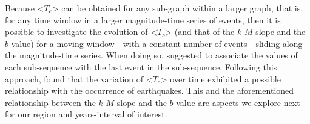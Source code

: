 Because <$T_c$> can be obtained for any sub-graph within a larger graph, that is, for any time window in a larger magnitude-time series of events, then it is possible to investigate the evolution of <$T_c$> (and that of the $k$-$M$ slope and the $b$-value) for a moving window---with a constant number of events---sliding along the magnitude-time series. When doing so, \citet{Telesca2016} suggested to associate the values of each sub-sequence with the last event in the sub-sequence. Following this approach, \citet{Telesca2016} found that the variation of <$T_c$> over time exhibited a possible relationship with the occurrence of earthquakes. This and the aforementioned relationship between the $k$-$M$ slope and the $b$-value are aspects we explore next for our region and years-interval of interest.


